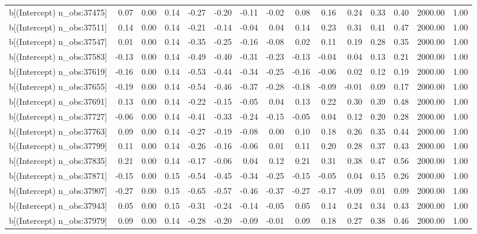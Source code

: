 \begin{table}[ht]
\begin{tabular}{rrrrrrrrrrrrrrr}
  b[(Intercept) n\_obs:37475] & 0.07 & 0.00 & 0.14 & -0.27 & -0.20 & -0.11 & -0.02 & 0.08 & 0.16 & 0.24 & 0.33 & 0.40 & 2000.00 & 1.00 \\ 
  b[(Intercept) n\_obs:37511] & 0.14 & 0.00 & 0.14 & -0.21 & -0.14 & -0.04 & 0.04 & 0.14 & 0.23 & 0.31 & 0.41 & 0.47 & 2000.00 & 1.00 \\ 
  b[(Intercept) n\_obs:37547] & 0.01 & 0.00 & 0.14 & -0.35 & -0.25 & -0.16 & -0.08 & 0.02 & 0.11 & 0.19 & 0.28 & 0.35 & 2000.00 & 1.00 \\ 
  b[(Intercept) n\_obs:37583] & -0.13 & 0.00 & 0.14 & -0.49 & -0.40 & -0.31 & -0.23 & -0.13 & -0.04 & 0.04 & 0.13 & 0.21 & 2000.00 & 1.00 \\ 
  b[(Intercept) n\_obs:37619] & -0.16 & 0.00 & 0.14 & -0.53 & -0.44 & -0.34 & -0.25 & -0.16 & -0.06 & 0.02 & 0.12 & 0.19 & 2000.00 & 1.00 \\ 
  b[(Intercept) n\_obs:37655] & -0.19 & 0.00 & 0.14 & -0.54 & -0.46 & -0.37 & -0.28 & -0.18 & -0.09 & -0.01 & 0.09 & 0.17 & 2000.00 & 1.00 \\ 
  b[(Intercept) n\_obs:37691] & 0.13 & 0.00 & 0.14 & -0.22 & -0.15 & -0.05 & 0.04 & 0.13 & 0.22 & 0.30 & 0.39 & 0.48 & 2000.00 & 1.00 \\ 
  b[(Intercept) n\_obs:37727] & -0.06 & 0.00 & 0.14 & -0.41 & -0.33 & -0.24 & -0.15 & -0.05 & 0.04 & 0.12 & 0.20 & 0.28 & 2000.00 & 1.00 \\ 
  b[(Intercept) n\_obs:37763] & 0.09 & 0.00 & 0.14 & -0.27 & -0.19 & -0.08 & 0.00 & 0.10 & 0.18 & 0.26 & 0.35 & 0.44 & 2000.00 & 1.00 \\ 
  b[(Intercept) n\_obs:37799] & 0.11 & 0.00 & 0.14 & -0.26 & -0.16 & -0.06 & 0.01 & 0.11 & 0.20 & 0.28 & 0.37 & 0.43 & 2000.00 & 1.00 \\ 
  b[(Intercept) n\_obs:37835] & 0.21 & 0.00 & 0.14 & -0.17 & -0.06 & 0.04 & 0.12 & 0.21 & 0.31 & 0.38 & 0.47 & 0.56 & 2000.00 & 1.00 \\ 
  b[(Intercept) n\_obs:37871] & -0.15 & 0.00 & 0.15 & -0.54 & -0.45 & -0.34 & -0.25 & -0.15 & -0.05 & 0.04 & 0.15 & 0.26 & 2000.00 & 1.00 \\ 
  b[(Intercept) n\_obs:37907] & -0.27 & 0.00 & 0.15 & -0.65 & -0.57 & -0.46 & -0.37 & -0.27 & -0.17 & -0.09 & 0.01 & 0.09 & 2000.00 & 1.00 \\ 
  b[(Intercept) n\_obs:37943] & 0.05 & 0.00 & 0.15 & -0.31 & -0.24 & -0.14 & -0.05 & 0.05 & 0.14 & 0.24 & 0.34 & 0.43 & 2000.00 & 1.00 \\ 
  b[(Intercept) n\_obs:37979] & 0.09 & 0.00 & 0.14 & -0.28 & -0.20 & -0.09 & -0.01 & 0.09 & 0.18 & 0.27 & 0.38 & 0.46 & 2000.00 & 1.00 \\ 

\end{tabular}
\end{table}
